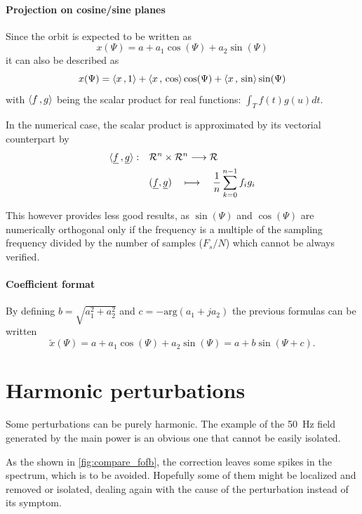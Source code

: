 \paragraph{Projection on cosine/sine planes}
Since the orbit is expected to be written as
\begin{equation*}
x(\Psi) = a+ a_1 \cos(\Psi) + a_2 \sin(\Psi)
\end{equation*}
it can also be described as
\begin{equation}
x(\Psi) = \langle x {\,,\,} 1 \rangle + \langle x {\,,\,} \cos \rangle \cos(\Psi) + \langle x {\,,\,} \sin \rangle \sin(\Psi)
\end{equation}
with $\langle f {\,,\,} g \rangle$ being the scalar product for real functions: $\int_T f(t)g(u)dt$.

In the numerical case, the scalar product is approximated by its vectorial counterpart by
\begin{align*}
\langle \underline{f} {\,,\,} \underline{g} \rangle: \quad
 &\mathcal{R}^n \times \mathcal{R}^n \longrightarrow \mathcal{R} \\
 & (\underline{f},\underline{g}) \quad\longmapsto \quad \frac{1}{n}\sum\limits_{k=0}^{n-1} f_i g_i
\end{align*}

This however provides less good results, as $\sin(\Psi)$ and $\cos(\Psi)$ are numerically orthogonal only if the frequency is a multiple of the sampling frequency divided by the number of samples ($F_s/N$) which cannot be always verified.

\paragraph{Coefficient format}
By defining $b = \sqrt{a_1^2+a_2^2}$ and $c = -\mathrm{arg}(a_1 + j a_2)$ the previous formulas can be written
\begin{equation*}
\tilde{x}(\Psi) = a + a_1 \cos(\Psi) + a_2 \sin(\Psi) = a + b \sin(\Psi + c).
\end{equation*}


\section{Harmonic perturbations}
\label{sec:loc_dyn}
Some perturbations can be purely harmonic. The example of the \SI{50}{\hertz} field generated by the main power is an obvious one that cannot be easily isolated. 

As the shown in \cref{fig:compare_fofb}, the correction leaves some spikes in the spectrum, which is to be avoided. Hopefully some of them might be localized and removed or isolated, dealing again with the cause of the perturbation instead of its symptom.


